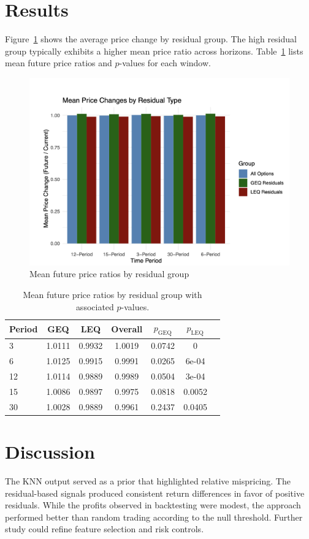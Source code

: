 \documentclass{article}
\begin{document}
\section{Results}
Figure~\ref{fig:price-diff} shows the average price change by residual group. The high residual group typically exhibits a higher mean price ratio across horizons. Table~\ref{tab:mean-return} lists mean future price ratios and $p$-values for each window.
\begin{figure}[h]
  \centering
  \includegraphics[width=0.8\linewidth]{data/results/mean_price_diff.png}
  \caption{Mean future price ratios by residual group}
  \label{fig:price-diff}
\end{figure}
\begin{table}[h]
  \centering
  \begin{tabular}{lcccccc}
    \toprule
    Period & GEQ & LEQ & Overall & $p_{\text{GEQ}}$ & $p_{\text{LEQ}}$ \\
    \midrule
    3  & 1.0111 & 0.9932 & 1.0019 & 0.0742 & 0     \\
    6  & 1.0125 & 0.9915 & 0.9991 & 0.0265 & 6e-04 \\
    12 & 1.0114 & 0.9889 & 0.9989 & 0.0504 & 3e-04 \\
    15 & 1.0086 & 0.9897 & 0.9975 & 0.0818 & 0.0052 \\
    30 & 1.0028 & 0.9889 & 0.9961 & 0.2437 & 0.0405 \\
    \bottomrule
  \end{tabular}
  \caption{Mean future price ratios by residual group with associated $p$-values.}
  \label{tab:mean-return}
\end{table}
\section{Discussion}
The KNN output served as a prior that highlighted relative mispricing. The residual-based signals produced consistent return differences in favor of positive residuals. While the profits observed in backtesting were modest, the approach performed better than random trading according to the null threshold. Further study could refine feature selection and risk controls.
\end{document}
